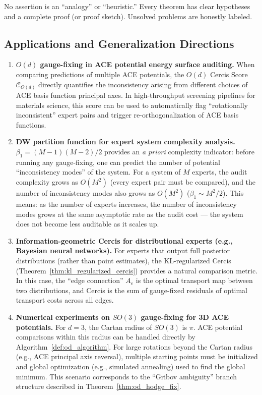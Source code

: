\documentclass[12pt,a4paper]{article}
\theoremstyle{definition}
\theoremstyle{remark}
\theoremstyle{definition}
\newcommand{\Od}{O(d)}
\newcommand{\SOthree}{SO(3)}
\newcommand{\cercis}{\mathcal{C}}
\newcommand{\ZBetti}{\beta_1}
\begin{document}
No assertion is an ``analogy'' or ``heuristic.'' Every theorem has clear hypotheses and a complete proof (or proof sketch).
Unsolved problems are honestly labeled.

\subsection{Applications and Generalization Directions}

\begin{enumerate}[label=(\arabic*)]
    \item \textbf{$O(d)$ gauge-fixing in ACE potential energy surface auditing.}
    When comparing predictions of multiple ACE potentials, the $O(d)$ Cercis Score $\cercis_{\Od}$ directly quantifies
    the inconsistency arising from different choices of ACE basis function principal axes. In high-throughput screening pipelines for materials science,
    this score can be used to automatically flag ``rotationally inconsistent'' expert pairs and trigger re-orthogonalization of ACE basis functions.

    \item \textbf{DW partition function for expert system complexity analysis.}
    $\ZBetti = (M-1)(M-2)/2$ provides an \emph{a priori} complexity indicator:
    before running any gauge-fixing, one can predict the number of potential ``inconsistency modes'' of the system.
    For a system of $M$ experts, the audit complexity grows as $O(M^2)$ (every expert pair must be compared),
    and the number of inconsistency modes also grows as $O(M^2)$ ($\ZBetti \sim M^2/2$).
    This means: as the number of experts increases, the number of inconsistency modes grows at the same asymptotic rate as the audit cost —
    the system does not become less auditable as it scales up.

    \item \textbf{Information-geometric Cercis for distributional experts (e.g., Bayesian neural networks).}
    For experts that output full posterior distributions (rather than point estimates),
    the KL-regularized Cercis (Theorem~\ref{thm:kl_regularized_cercis}) provides a natural comparison metric.
    In this case, the ``edge connection'' $A_e$ is the optimal transport map between two distributions,
    and Cercis is the sum of gauge-fixed residuals of optimal transport costs across all edges.

    \item \textbf{Numerical experiments on $\SOthree$ gauge-fixing for 3D ACE potentials.}
    For $d=3$, the Cartan radius of $\SOthree$ is $\pi$.
    ACE potential comparisons within this radius can be handled directly by Algorithm~\ref{def:od_algorithm}.
    For large rotations beyond the Cartan radius (e.g., ACE principal axis reversal),
    multiple starting points must be initialized and global optimization (e.g., simulated annealing) used to find the global minimum.
    This scenario corresponds to the ``Gribov ambiguity'' branch structure described in Theorem~\ref{thm:od_hodge_fix}.


\end{enumerate}
\end{document}
